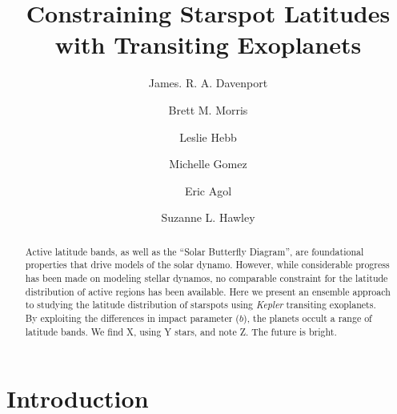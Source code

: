 \documentclass[preprint2]{aastex61}
\newcommand{\Kepler}{\textsl{Kepler}\xspace}
\begin{document}
\title{Constraining Starspot Latitudes with Transiting Exoplanets}



\author{James. R. A. Davenport}

\author{Brett M. Morris}

\author{Leslie Hebb}

\author{Michelle Gomez}

\author{Eric Agol}

\author{Suzanne L. Hawley}



\begin{abstract}
Active latitude bands, as well as the ``Solar Butterfly Diagram'', are foundational properties that drive models of the solar dynamo. However, while considerable progress has been made on modeling stellar dynamos, no comparable constraint for the latitude distribution of active regions has been available. Here we present an ensemble approach to studying the latitude distribution of starspots using \Kepler transiting exoplanets. By exploiting the differences in impact parameter ($b$), the planets occult a range of latitude bands. We find X, using Y stars, and note Z. The future is bright.
\end{abstract}



\section{Introduction}
\label{sec:intro}
\end{document}
